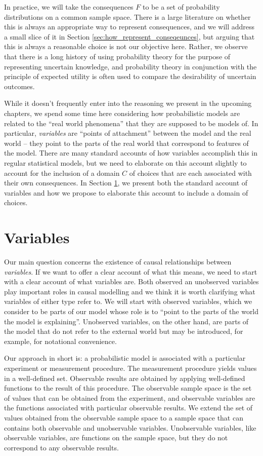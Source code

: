 In practice, we will take the consequences $F$ to be a set of probability distributions on a common sample space. There is a large literature on whether this is always an appropriate way to represent consequences, and we will address a small slice of it in Section \ref{sec:how_represent_conseqeunces}, but arguing that this is always a reasonable choice is not our objective here. Rather, we observe that there is a long history of using probability theory for the purpose of representing uncertain knowledge, and probability theory in conjunction with the principle of expected utility is often used to compare the desirability of uncertain outcomes.

While it doesn't frequently enter into the reasoning we present in the upcoming chapters, we spend some time here considering how probabilistic models are related to the ``real world phenomena'' that they are supposed to be models of. In particular, \emph{variables} are ``points of attachment'' between the model and the real world -- they point to the parts of the real world that correspond to features of the model. There are many standard accounts of how variables accomplish this in regular statistical models, but we need to elaborate on this account slightly to account for the inclusion of a domain $C$ of choices that are each associated with their own consequences. In Section \ref{sec:variable}, we present both the standard account of variables and how we propose to elaborate this account to include a domain of choices.


\section{Variables}\label{sec:variable}

Our main question concerns the existence of causal relationships between \emph{variables}. If we want to offer a clear account of what this means, we need to start with a clear account of what variables are. Both observed an unobserved variables play important roles in causal modelling and we think it is worth clarifying what variables of either type refer to. We will start with observed variables, which we consider to be parts of our model whose role is to ``point to the parts of the world the model is explaining''. Unobserved variables, on the other hand, are parts of the model that do not refer to the external world but may be introduced, for example, for notational convenience.

Our approach in short is: a probabilistic model is associated with a particular experiment or measurement procedure. The measurement procedure yields values in a well-defined set. Observable results are obtained by applying well-defined functions to the result of this procedure. The observable sample space is the set of values that can be obtained from the experiment, and observable variables are the functions associated with particular observable results. We extend the set of values obtained from the observable sample space to a sample space that can contains both observable and unobservable variables. Unobservable variables, like observable variables, are functions on the sample space, but they do not correspond to any observable results.


